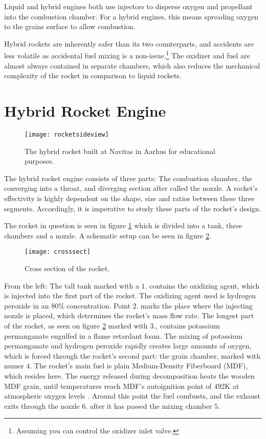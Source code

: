 	Liquid and hybrid engines both use injectors to disperse oxygen and propellant into the combustion chamber. For a hybrid engines, this means spreading oxygen to the grains surface to allow combustion.

	Hybrid rockets are inherently safer than its two counterparts, and accidents are less volatile as accidental fuel mixing is a non-issue.\footnote{Assuming you can control the oxidizer inlet valve.} The oxidizer and fuel are almost always contained in separate chambers, which also reduces the mechanical complexity of the rocket in comparison to liquid rockets.

\section{Hybrid Rocket Engine}

\begin{figure}
	\centering
	\texttt{[image: rocketsideview]}
	\caption{The hybrid rocket built at Navitas in Aarhus for educational purposes.}
	\label{fig:rocketpic}
\end{figure}

	The hybrid rocket engine consists of three parts: The combustion chamber, the converging into a throat, and diverging section after called the nozzle. A rocket's effectivity is highly dependent on the shape, size and ratios between these three segments. Accordingly, it is imperative to study these parts of the rocket's design.

	The rocket in question is seen in figure \ref{fig:rocketpic} which is divided into a tank, three chambers and a nozzle. A schematic setup can be seen in figure \ref{fig:crosssect}.

	\begin{figure}
		\texttt{[image: crosssect]}
		\caption{Cross section of the rocket.}
		\label{fig:crosssect}
	\end{figure}

	From the left: The tall tank marked with a $1.$ contains the oxidizing agent, which is injected into the first part of the rocket. The oxidizing agent used is hydrogen peroxide in an $80\%$ concentration. Point $2.$ marks the place where the injecting nozzle is placed, which determines the rocket's mass flow rate. The longest part of the rocket, as seen on figure \ref{fig:crosssect} marked with $3.$, contains potassium permanganate engulfed in a flame retardant foam. The mixing of potassium permanganate and hydrogen peroxide rapidly creates large amounts of oxygen, which is forced through the rocket's second part: the grain chamber, marked with numer $4.$ The rocket's main fuel is plain Medium-Density Fiberboard (MDF), which resides here. The energy released during decomposition heats the wooden MDF grain, until temperatures reach MDF's autoignition point of 492K at atmospheric oxygen levels \cite{mdfAIT}. Around this point the fuel combusts, and the exhaust exits through the nozzle $6.$ after it has passed the mixing chamber $5$.

